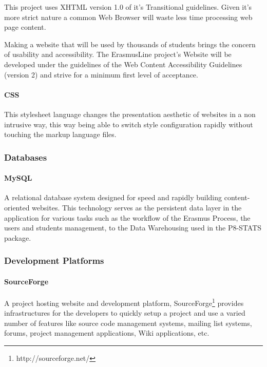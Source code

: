 This project uses XHTML version 1.0 of it's Transitional
guidelines. Given it's more strict nature a common Web Browser will waste less
time processing web page content. 

Making a website that will be used by
thousands of students brings the concern of usability and accessibility. The
ErasmusLine project's Website will be developed under the guidelines of the Web
Content Accessibility Guidelines (version 2) and strive for a minimum first
level of acceptance. 

\paragraph{CSS}

This stylesheet language changes the presentation aesthetic of websites in a non
intrusive way, this way being able to switch style configuration rapidly without
touching the markup language files.

\subsubsection{Databases}

\paragraph{MySQL}

A relational database system designed for speed and rapidly building
content-oriented websites. This technology serves as the persistent data layer
in the application for various tasks such as the workflow of the Erasmus
Process, the users and students management, to the Data Warehousing used in the
P8-STATS package.

\subsubsection{Development Platforms}

\paragraph{SourceForge}

A project hosting website and development platform,
SourceForge\footnote{http://sourceforge.net/} provides infrastructures for the developers to quickly setup a project and use a varied number of features like
source code management systems, mailing list systems, forums, project management
applications, Wiki applications, etc.

